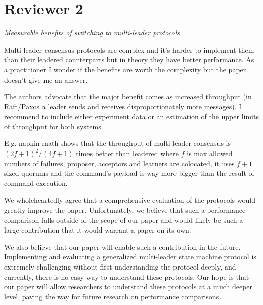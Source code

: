 \documentclass[letterpaper,twocolumn,10pt]{article}
\newenvironment{reviewerquote}
{\list{}{\leftmargin=\parindent\rightmargin=0in}\item[] \itshape \color{ReviewerDarkGray}}%
{\endlist}
\begin{document}
\section*{Reviewer 2}
\begin{reviewerquote}
  Measurable benefits of switching to multi-leader protocols

  Multi-leader consensus protocols are complex and it's harder to implement
  them than their leadered counterparts but in theory they have better
  performance. As a practitioner I wonder if the benefits are worth the
  complexity but the paper doesn't give me an answer.

  The authors advocate that the major benefit comes as increased throughput (in
  Raft/Paxos a leader sends and receives disproportionately more messages). I
  recommend to include either experiment data or an estimation of the upper
  limits of throughput for both systems.

  E.g. napkin math shows that the throughput of multi-leader consensus is
  $(2f+1)^2/(4f+1)$ times better than leadered where $f$ is max allowed numbers
  of failures, proposer, acceptors and learners are colocated, it uses $f+1$
  sized quorums and the command's payload is way more bigger than the result of
  command execution.
\end{reviewerquote}

We wholeheartedly agree that a comprehensive evaluation of the protocols would
greatly improve the paper. Unfortunately, we believe that such a performance
comparison falls outside of the scope of our paper and would likely be such a
large contribution that it would warrant a paper on its own.

We also believe that our paper will enable such a contribution in the future.
Implementing and evaluating a generalized multi-leader state machine protocol
is extremely challenging without first understanding the protocol deeply, and
currently, there is no easy way to understand these protocols. Our hope is that
our paper will allow researchers to understand these protocols at a much deeper
level, paving the way for future research on performance comparisons.
\end{document}

